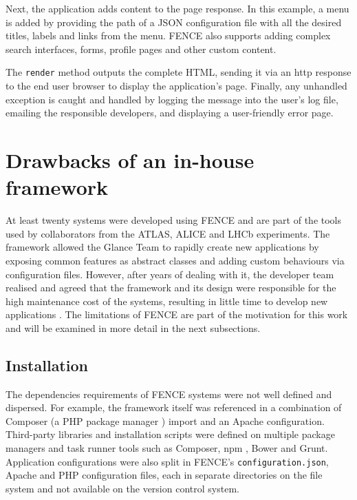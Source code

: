 Next, the application adds content to the page response. In this example, a menu is added by providing the path of a JSON configuration file with all the desired titles, labels and links from the menu. FENCE also supports adding complex search interfaces, forms, profile pages and other custom content.

The \texttt{render} method outputs the complete HTML, sending it via an \acrshort{http} response to the end user browser to display the application's page. Finally, any unhandled exception is caught and handled by logging the message into the user's log file, emailing the responsible developers, and displaying a user-friendly error page.

\section{Drawbacks of an in-house framework}

At least twenty systems were developed using FENCE \cite{pinhao-tcc} and are part of the tools used by collaborators from the ATLAS, ALICE and LHCb experiments. The framework allowed the Glance Team to rapidly create new applications by exposing common features as abstract classes and adding custom behaviours via configuration files. However, after years of dealing with it, the developer team realised and agreed that the framework and its design were responsible for the high maintenance cost of the systems, resulting in little time to develop new applications \cite{de-jesus-tcc}. The limitations of FENCE are part of the motivation for this work and will be examined in more detail in the next subsections.

\subsection{Installation}

The dependencies requirements of FENCE systems were not well defined and dispersed. For example, the framework itself was referenced in a combination of Composer (a PHP package manager \cite{composer-website}) import and an Apache configuration. Third-party libraries and installation scripts were defined on multiple package managers and task runner tools such as Composer, npm \cite{npm-website}, Bower \cite{bower-website} and Grunt\cite{grunt-website}. Application configurations were also split in FENCE's \texttt{configuration.json}, Apache and PHP configuration files, each in separate directories on the file system and not available on the version control system.

